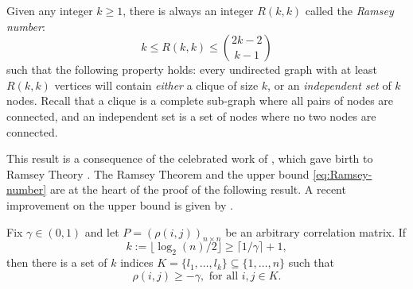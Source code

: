 


Given any integer $k\ge 1$, there is always an integer $R(k,k)$ called the {\em Ramsey number}:
\begin{equation}\label{eq:Ramsey-number}
k\le R(k,k)\le \binom{2k-2}{k-1}
\end{equation}
such that the following property holds:
every undirected graph with at least $R(k,k)$ vertices will contain {\em either} a clique of size $k$, or an {\em independent set} of $k$ nodes. 
Recall that a clique is a complete sub-graph where all pairs of nodes are connected, and an independent set is a set of nodes where no two nodes are connected.

This result is a consequence of the celebrated work of \citet{ramsey2009problem}, which 
gave birth to Ramsey Theory \citep[see e.g.,][]{conlon2015recent}.  
The Ramsey Theorem and the upper bound \eqref{eq:Ramsey-number} \citep[established first in][]{erdos1935combinatorial} are at the heart of the proof of the following result.  A recent improvement on the upper bound is given by \cite{sah:2020}.

\begin{proposition} \label{prop:lower-bound-correlation-Ramsey}
  Fix $\gamma\in(0,1)$ and let $P = \left(\rho(i,j)\right)_{n\times n}$ be an arbitrary correlation
  matrix. If 
  \begin{equation}\label{eq:Ramsey-the-k-def}
   k:= \lfloor \log_2({n})/2 \rfloor  \ge \lceil 1/\gamma \rceil + 1,
  \end{equation}
  then there is a set of $k$ indices $K = \{l_1, \ldots, l_k\}\subseteq \{1,\ldots,n\}$ 
  such that 
  \begin{equation} \label{eq:lower-bound-correlation-Ramsey}
      \rho(i,j) \ge -\gamma, \mbox{ for all } i,j\in K.
  \end{equation}
\end{proposition}

